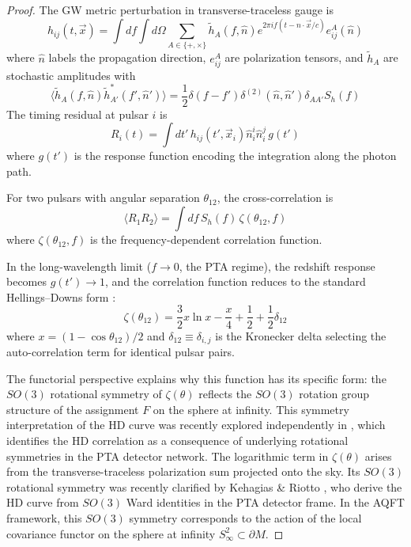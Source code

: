 \documentclass[11pt,a4paper]{article}
\begin{document}
\begin{proof}
The GW metric perturbation in transverse-traceless gauge is
\begin{equation}
h_{ij}(t, \vec{x}) = \int df \int d\Omega \sum_{A \in \{+,\times\}} \tilde{h}_A(f, \hat{n}) e^{2\pi i f (t - \hat{n}\cdot\vec{x}/c)} e_{ij}^A(\hat{n})
\end{equation}
where $\hat{n}$ labels the propagation direction, $e_{ij}^A$ are polarization tensors, and $\tilde{h}_A$ are stochastic amplitudes with
\begin{equation}
\langle \tilde{h}_A(f, \hat{n}) \tilde{h}_{A'}^*(f', \hat{n}') \rangle = \frac{1}{2} \delta(f-f') \delta^{(2)}(\hat{n}, \hat{n}') \delta_{AA'} S_h(f)
\end{equation}
The timing residual at pulsar $i$ is
\begin{equation}
R_i(t) = \int dt' \, h_{ij}(t', \vec{x}_i) \hat{n}_i^i \hat{n}_i^j \, g(t')
\end{equation}
where $g(t')$ is the response function encoding the integration along the photon path.

For two pulsars with angular separation $\theta_{12}$, the cross-correlation is
\begin{equation}
\langle R_1 R_2 \rangle = \int df \, S_h(f) \, \zeta(\theta_{12}, f)
\end{equation}
where $\zeta(\theta_{12}, f)$ is the frequency-dependent correlation function.

In the long-wavelength limit ($f \to 0$, the PTA regime), the redshift response becomes $g(t') \to 1$, and the correlation function reduces to the standard Hellings--Downs form \cite{Hellings:1983,Anholm:2009}:
\begin{equation}
\zeta(\theta_{12}) = \frac{3}{2} x \ln x - \frac{x}{4} + \frac{1}{2} + \frac{1}{2}\delta_{12}
\end{equation}
where $x = (1-\cos\theta_{12})/2$ and $\delta_{12} \equiv \delta_{i,j}$ is the Kronecker delta selecting the auto-correlation term for identical pulsar pairs.

The functorial perspective explains why this function has its specific form: the $SO(3)$ rotational symmetry of $\zeta(\theta)$ reflects the $SO(3)$ rotation group structure of the assignment $F$ on the sphere at infinity. This symmetry interpretation of the HD curve was recently explored independently in \cite{Kehagias:2024}, which identifies the HD correlation as a consequence of underlying rotational symmetries in the PTA detector network. The logarithmic term in $\zeta(\theta)$ arises from the transverse-traceless polarization sum projected onto the sky. Its $SO(3)$ rotational symmetry was recently clarified by Kehagias \& Riotto \cite{Kehagias:2024}, who derive the HD curve from $SO(3)$ Ward identities in the PTA detector frame. In the AQFT framework, this $SO(3)$ symmetry corresponds to the action of the local covariance functor on the sphere at infinity $S^2_\infty \subset \partial M$.


\end{proof}
\end{document}
